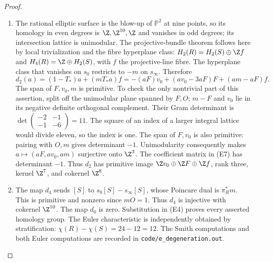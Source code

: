 \begin{proof}
\begin{enumerate}[label=\arabic*.,leftmargin=*]
\item The rational elliptic surface is the blow-up of $\mathbb P^2$ at nine
points, so its homology in even degrees is $\Z,\Z^{10},\Z$ and
vanishes in odd degrees; its intersection lattice is unimodular.
The projective-bundle theorem follows here by local trivialization
and the fibre hyperplane class: $H_2(R)=H_2(S)\oplus\Z f$ and
$H_4(R)=\Z\oplus H_2(S)$, with $f$ the projective-line fibre.
The hyperplane class that vanishes on $s_0$ restricts to $-m$ on
$s_\infty$. Therefore
\[
 d_2(a)=(1-T_*)a+(mT_*a)f
       =-(aF)v_0+(av_0-3aF)F+(am-aF)f.                       \tag{E7}
\]
The span of $F,v_0,m$ is primitive. To check the only nontrivial
part of this assertion, split off the unimodular plane spanned by
$F,O$; $m-F$ and $v_0$ lie in its negative definite orthogonal
complement. Their Gram determinant is
$\det\left(\begin{smallmatrix}-2&-1\\-1&-6\end{smallmatrix}\right)=11$.
The square of an index of a larger integral lattice would divide
eleven, so the index is one. The span of $F,v_0$ is also primitive:
pairing with $O,m$ gives determinant $-1$. Unimodularity consequently
makes $a\mapsto(aF,av_0,am)$ surjective onto $\Z^3$. The coefficient
matrix in (E7) has determinant $-1$. Thus $d_2$ has primitive image
$\Z v_0\oplus\Z F\oplus\Z f$, rank three, kernel $\Z^7$,
and cokernel $\Z^8$.

\item The map $d_4$ sends $[S]$ to $s_0[S]-s_\infty[S]$, whose Poincare
dual is $\pi_R^*m$. This is primitive and nonzero since $mO=1$.
Thus $d_4$ is injective with cokernel $\Z^{10}$. The map $d_0$ is
zero. Substitution in (E4) proves every asserted homology group.
The Euler characteristic is independently obtained by stratification:
$\chi(R)-\chi(S)=24-12=12$. The Smith computations and both Euler
computations are recorded in \texttt{code/e\_degeneration.out}.
\end{enumerate}
\end{proof}


